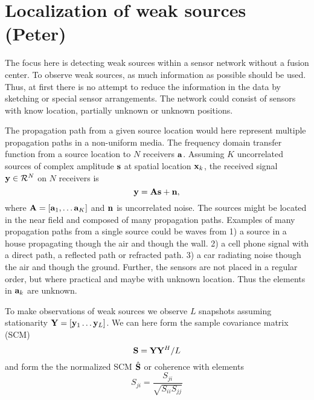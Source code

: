 \section{Localization of weak sources (Peter)}


The focus here is detecting weak sources within a sensor network without a fusion center. To observe weak sources, as much information as possible should be used. Thus, at first there is no attempt to reduce the information in the data by sketching or special sensor arrangements. The network could consist of sensors with know location, partially unknown or unknown positions.

The propagation path from a given source location would here represent multiple propagation paths in a non-uniform media. The frequency domain transfer function from a source location to $N$ receivers ${\bf a}$. Assuming $K$ uncorrelated sources of complex amplitude ${\bf s}$ at spatial location ${\bf x}_k$, the received signal ${\bf y}\in {\cal R}^N$ on $N$ receivers is 
\begin{equation}
{\bf y}={\bf A}{\bf s}+{\bf n},
\end{equation}
where ${\bf A}=[{\bf a}_1, \ldots {\bf a}_K ]$  and $\bf n$ is uncorrelated noise. 
The sources might be located in the near field and  composed of many propagation paths. Examples of many propagation paths from a single source could be waves from  
1) a source in a house propagating though the air and though the wall.
2) a cell phone signal with a direct path, a reflected path or refracted path.
3) a car radiating noise though the air and though the ground.
Further, the sensors are not placed in a regular order, but where practical and maybe with unknown location. Thus the elements in ${\bf a}_k$ are unknown.


To make observations of weak sources we observe $L$ snapshots  assuming  stationarity ${\bf Y}=[{\bf y}_1 \ldots {\bf y}_L]$.
We can here form the sample covariance matrix (SCM)
\begin{equation}
{\bf S} ={\bf Y}{\bf Y}^H/L
\end{equation}
and form the the normalized SCM $\hat{\bf S}$ or coherence with elements
\begin{equation}
{ S}_{ji} =\frac{{ S}_{ji}}{\sqrt{ { S}_{ii}{ S}_{jj}}}
\end{equation}

